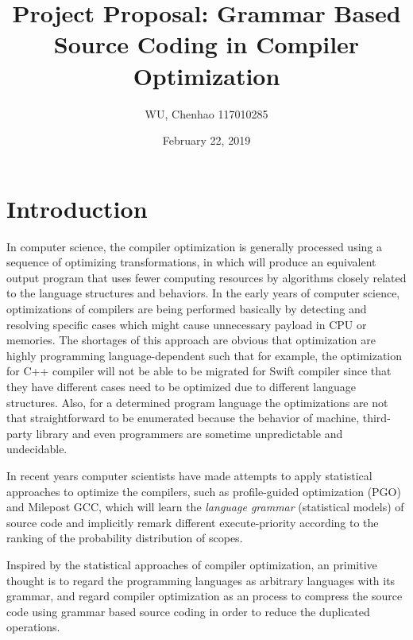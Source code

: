 \documentclass[12pt]{article}
\author{WU, Chenhao  117010285}
\title{Project Proposal: Grammar Based Source Coding in Compiler Optimization}
\date{February 22, 2019}
\begin{document}
	\maketitle
	\section{Introduction}
	In computer science, the compiler optimization is generally processed using a sequence of optimizing transformations, in which will produce an equivalent output program that uses fewer computing resources by algorithms closely related to the language structures and behaviors. In the early years of computer science, optimizations of compilers are being performed basically by detecting and resolving specific cases which might cause unnecessary payload in CPU or memories. The shortages of this approach are obvious that optimization are highly programming language-dependent such that for example, the optimization for C++ compiler will not be able to be migrated for Swift compiler since that they have different cases need to be optimized due to different language structures. Also, for a determined program language the optimizations are not that straightforward to be enumerated because the behavior of machine, third-party library and even programmers are sometime unpredictable and undecidable. \par  
	In recent years computer scientists have made attempts to apply statistical approaches to optimize the compilers, such as profile-guided optimization (PGO) and Milepost GCC, which will learn the \textit{language grammar} (statistical models) of source code and implicitly remark different execute-priority according to the ranking of the probability distribution of scopes. \par 
	Inspired by the statistical approaches of compiler optimization, an primitive thought is to regard the programming languages as arbitrary languages with its grammar, and regard compiler optimization as an process to compress the source code using grammar based source coding in order to reduce the duplicated operations.
	
\end{document}

